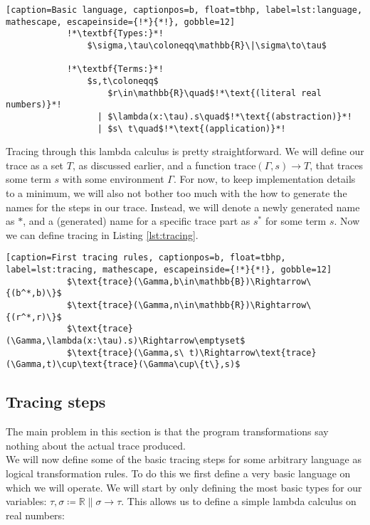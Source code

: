         \begin{lstlisting}[caption=Basic language, captionpos=b, float=tbhp, label=lst:language, mathescape, escapeinside={!*}{*!}, gobble=12]
            !*\textbf{Types:}*!
                $\sigma,\tau\coloneqq\mathbb{R}\|\sigma\to\tau$

            !*\textbf{Terms:}*!
                $s,t\coloneqq$
                    $r\in\mathbb{R}\quad$!*\text{(literal real numbers)}*!
                  | $\lambda(x:\tau).s\quad$!*\text{(abstraction)}*!
                  | $s\ t\quad$!*\text{(application)}*!
        \end{lstlisting}

        Tracing through this lambda calculus is pretty straightforward.
        We will define our trace as a set $T$, as discussed earlier, and a function $\text{trace}(\Gamma, s)\to T$, that traces some term $s$ with some environment $\Gamma$.
        For now, to keep implementation details to a minimum, we will also not bother too much with the how to generate the names for the steps in our trace.
        Instead, we will denote a newly generated name as $*$, and a (generated) name for a specific trace part as $s^*$ for some term $s$.
        Now we can define tracing in Listing \ref{lst:tracing}.

        \begin{lstlisting}[caption=First tracing rules, captionpos=b, float=tbhp, label=lst:tracing, mathescape, escapeinside={!*}{*!}, gobble=12]
            $\text{trace}(\Gamma,b\in\mathbb{B})\Rightarrow\{(b^*,b)\}$
            $\text{trace}(\Gamma,n\in\mathbb{R})\Rightarrow\{(r^*,r)\}$
            $\text{trace}(\Gamma,\lambda(x:\tau).s)\Rightarrow\emptyset$
            $\text{trace}(\Gamma,s\ t)\Rightarrow\text{trace}(\Gamma,t)\cup\text{trace}(\Gamma\cup\{t\},s)$
        \end{lstlisting}

    \subsection{Tracing steps} \label{sec:lambda}
        {\color{red}The main problem in this section is that the program transformations say nothing about the actual trace produced.}\\
        We will now define some of the basic tracing steps for some arbitrary language as logical transformation rules.
        To do this we first define a very basic language on which we will operate.
        We will start by only defining the most basic types for our variables: $\tau,\sigma\coloneqq\mathbb{R}\|\sigma\to\tau$.
        This allows us to define a simple lambda calculus on real numbers:

